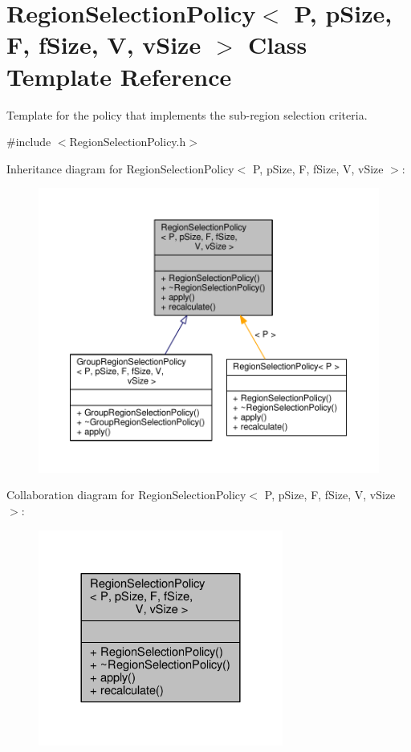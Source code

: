 \hypertarget{classRegionSelectionPolicy}{}\section{Region\+Selection\+Policy$<$ P, p\+Size, F, f\+Size, V, v\+Size $>$ Class Template Reference}
\label{classRegionSelectionPolicy}


Template for the policy that implements the sub-\/region selection criteria.  




{\ttfamily \#include $<$Region\+Selection\+Policy.\+h$>$}



Inheritance diagram for Region\+Selection\+Policy$<$ P, p\+Size, F, f\+Size, V, v\+Size $>$\+:
\nopagebreak
\begin{figure}[H]
\begin{center}
\leavevmode
\includegraphics[width=350pt]{classRegionSelectionPolicy__inherit__graph}
\end{center}
\end{figure}


Collaboration diagram for Region\+Selection\+Policy$<$ P, p\+Size, F, f\+Size, V, v\+Size $>$\+:
\nopagebreak
\begin{figure}[H]
\begin{center}
\leavevmode
\includegraphics[width=228pt]{classRegionSelectionPolicy__coll__graph}
\end{center}
\end{figure}
